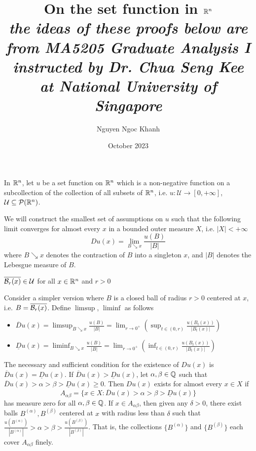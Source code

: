 \documentclass{article}
\title{
    On the set function in $\mathbb{R}^n$ \\
    \large \textit{the ideas of these proofs below are from MA5205 Graduate Analysis I instructed by Dr. Chua Seng Kee at National University of Singapore}
}
\author{Nguyen Ngoc Khanh}
\date{October 2023}
\begin{document}
\maketitle

In $\mathbb{R}^n$, let $u$ be a set function on $\mathbb{R}^n$ which is a non-negative function on a subcollection of the collection of all subsets of $\mathbb{R}^n$, i.e. $u: \mathcal{U} \to [0, +\infty]$, $\mathcal{U} \subseteq \mathcal{P}(\mathbb{R}^n)$. 

We will construct the smallest set of assumptions on $u$ such that the following limit converges for almost every $x$ in a bounded outer measure $X$, i.e. $|X| < +\infty$
\[
    Du(x) = \lim_{B \searrow x} \frac{u(B)}{|B|} 
\]
where $B \searrow x$ denotes the contraction of $B$ into a singleton $x$, and $|B|$ denotes the Lebesgue measure of $B$.

\begin{assumption}
    $\overline{\mathcal{B}_r(x)} \in \mathcal{U}$ for all $x \in \mathbb{R}^n$ and $r > 0$
\end{assumption}

Consider a simpler version where $B$ is a closed ball of radius $r > 0$ centered at $x$, i.e. $B = \overline{\mathcal{B}_r(x)}$. Define $\limsup$, $\liminf$ as follows
\begin{itemize}
    \item $\overline{D}u(x) = \limsup_{B \searrow x} \frac{u(B)}{|B|} = \lim_{r \to 0^+} \left( \sup_{t \in (0, r)} \frac{u(B_t(x))} {|B_t(x)|} \right)$
    \item $\underline{D}u(x) = \liminf_{B \searrow x} \frac{u(B)}{|B|} = \lim_{r \to 0^+} \left( \inf_{t \in (0, r)} \frac{u(B_t(x))} {|B_t(x)|} \right)$
\end{itemize}

The necessary and sufficient condition for the existence of $Du(x)$ is $\overline{D}u(x) = \underline{D}u(x)$. If $\overline{D}u(x) > \underline{D}u(x)$, let $\alpha, \beta \in \mathbb{Q}$ such that $\overline{D}u(x) > \alpha > \beta > \underline{D}u(x) \geq 0$. Then $Du(x)$ exists for almost every $x \in X$ if 
\[
    A_{\alpha \beta} = \{x \in X: \overline{D}u(x) > \alpha > \beta > \underline{D}u(x)\}
\]
has measure zero for all $\alpha, \beta \in \mathbb{Q}$. If $x \in A_{\alpha \beta}$, then given any $\delta > 0$, there exist balls $B^{(\alpha)}, B^{(\beta)}$ centered at $x$ with radius less than $\delta$ such that $\frac{u(B^{(\alpha)})}{|B^{(\alpha)}|} > \alpha > \beta > \frac{u(B^{(\beta)})}{|B^{(\beta)}|}$. That is, the collections $\{B^{(\alpha)}\}$ and $\{B^{(\beta)}\}$ each cover $A_{\alpha \beta}$ finely.
\end{document}
